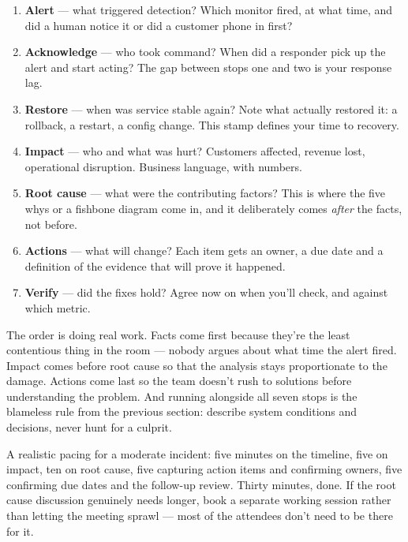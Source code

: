 \begin{enumerate}[leftmargin=*]
\item \textbf{Alert} — what triggered detection? Which monitor fired, at what time, and did a human notice it or did a customer phone in first?
\item \textbf{Acknowledge} — who took command? When did a responder pick up the alert and start acting? The gap between stops one and two is your response lag.
\item \textbf{Restore} — when was service stable again? Note what actually restored it: a rollback, a restart, a config change. This stamp defines your time to recovery.
\item \textbf{Impact} — who and what was hurt? Customers affected, revenue lost, operational disruption. Business language, with numbers.
\item \textbf{Root cause} — what were the contributing factors? This is where the five whys or a fishbone diagram come in, and it deliberately comes \emph{after} the facts, not before.
\item \textbf{Actions} — what will change? Each item gets an owner, a due date and a definition of the evidence that will prove it happened.
\item \textbf{Verify} — did the fixes hold? Agree now on when you'll check, and against which metric.
\end{enumerate}

The order is doing real work. Facts come first because they're the least contentious thing in the room — nobody argues about what time the alert fired. Impact comes before root cause so that the analysis stays proportionate to the damage. Actions come last so the team doesn't rush to solutions before understanding the problem. And running alongside all seven stops is the blameless rule from the previous section: describe system conditions and decisions, never hunt for a culprit.


A realistic pacing for a moderate incident: five minutes on the timeline, five on impact, ten on root cause, five capturing action items and confirming owners, five confirming due dates and the follow-up review. Thirty minutes, done. If the root cause discussion genuinely needs longer, book a separate working session rather than letting the meeting sprawl — most of the attendees don't need to be there for it.



